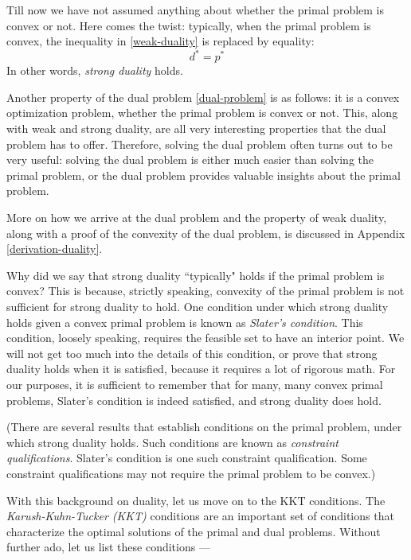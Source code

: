 \documentclass[a4paper]{article}
\theoremstyle{definition}
\begin{document}
Till now we have not assumed anything about whether the primal problem is convex or not.
Here comes the twist: typically, when the primal problem is convex, the inequality in \eqref{weak-duality} is replaced by equality:
\begin{equation}
	\label{strong-duality}
	d^* = p^*
\end{equation}
In other words, \textit{strong duality} holds.

Another property of the dual problem \eqref{dual-problem} is as follows: it is a convex optimization problem, whether the primal problem is convex or not.
This, along with weak and strong duality, are all very interesting properties that the dual problem has to offer.
Therefore, solving the dual problem often turns out to be very useful: solving the dual problem is either much easier than solving the primal problem, or the dual problem provides valuable insights about the primal problem.

More on how we arrive at the dual problem and the property of weak duality, along with a proof of the convexity of the dual problem, is discussed in Appendix \ref{derivation-duality}.

Why did we say that strong duality ``typically" holds if the primal problem is convex?
This is because, strictly speaking, convexity of the primal problem is not sufficient for strong duality to hold.
One condition under which strong duality holds given a convex primal problem is known as \textit{Slater's condition}.
This condition, loosely speaking, requires the feasible set to have an interior point.
We will not get too much into the details of this condition, or prove that strong duality holds when it is satisfied, because it requires a lot of rigorous math.
For our purposes, it is sufficient to remember that for many, many convex primal problems, Slater's condition is indeed satisfied, and strong duality does hold.

(There are several results that establish conditions on the primal problem, under which strong duality holds.
Such conditions are known as \textit{constraint qualifications}.
Slater's condition is one such constraint qualification.
Some constraint qualifications may not require the primal problem to be convex.)

With this background on duality, let us move on to the KKT conditions.
The \textit{Karush-Kuhn-Tucker (KKT)} conditions are an important set of conditions that characterize the optimal solutions of the primal and dual problems.
Without further ado, let us list these conditions ---
\end{document}
